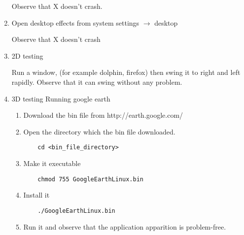 \documentclass[a4paper,10pt]{article}
\begin{document}
\begin{enumerate}
      Observe that X doesn't crash.
 \item Open desktop effects from system settings $\rightarrow$ desktop
 
      Observe that X doesn't crash
  \item 2D testing 
      
      Run a window, (for example dolphin, firefox) then swing it to right and left rapidly.
        Observe that it can swing without any problem.

 \item 3D testing
    Running google earth
     \begin{enumerate}
      \item Download the bin file from http://earth.google.com/
      \item Open the directory which the bin file downloaded.
	\begin{verbatim}
	cd <bin_file_directory>
	\end{verbatim}
      \item Make it executable
	\begin{verbatim}
	chmod 755 GoogleEarthLinux.bin
	\end{verbatim}
      \item Install it 
	\begin{verbatim}
	./GoogleEarthLinux.bin
	\end{verbatim}
      \item Run it and observe that the application apparition is problem-free.
    \end{enumerate}
\end{enumerate}
\end{document}
